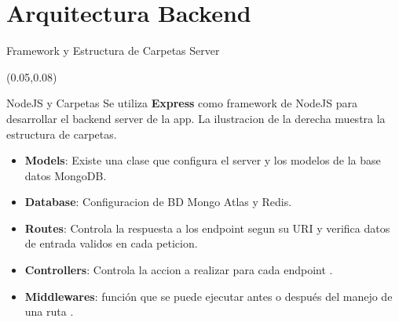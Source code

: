 \documentclass[xcolor=pdftex,dvipsnames,table]{beamer}
\begin{document}
\section{Arquitectura Backend}
\begin{frame}{Framework y Estructura de Carpetas Server}
    \begin{textblock*}{0.56\textwidth}(0.05\textwidth,0.08\textwidth)
            \begin{block}{NodeJS y Carpetas} 
            \justifying
                Se utiliza \textbf{Express} como framework de NodeJS para desarrollar el backend server de la app. La ilustracion de la derecha muestra la estructura de carpetas.
                    \vspace{-0.0cm}
                    \footnotesize {
                    \begin{itemize}
                      \setlength\itemsep{0.1em}
                        \item {\textbf{Models}: Existe una clase que configura el server y los modelos de la base datos MongoDB.}
                        \item {\textbf{Database}: Configuracion de BD Mongo Atlas y Redis.}
                        \item {\textbf{Routes}: Controla la respuesta a los endpoint segun su URI y verifica datos de entrada validos en cada peticion.}
                        \item {\textbf{Controllers}: Controla la accion a realizar para cada endpoint .}
                        \item {\textbf{Middlewares}: función que se puede ejecutar antes o después del manejo de una ruta .}
                    \end{itemize}}
            \end{block}
    \end{textblock*}
    

\end{frame}
\end{document}
